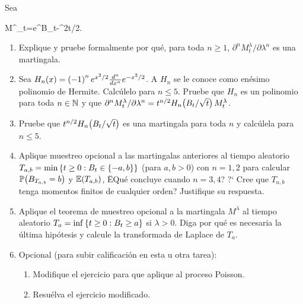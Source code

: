 \begin{problema}
	Sea
	\begin{esn}
		M^\lambda_t=e^{\lambda B_t-\lambda^2t/2}.
	\end{esn}
		\begin{enumerate}
			\item Explique y pruebe formalmente por qu\'e, para toda $n\geq 1$, $\partial^n M^\lambda_t/\partial \lambda^n$ es una martingala. 
			\item Sea $H_n\!\left( x\right) =\left( -1\right) ^ne^{x^2/2}\frac{d^n}{dx^n}e^{-x^2/2}$. A $H_n$ se le conoce como en\'esimo polinomio de Hermite. Calc\'ulelo para $n\leq 5$. Pruebe que $H_n$ es un polinomio para toda $n\in\mathbb{N}$ y que $\partial^n M^\lambda_t/\partial \lambda^n=t^{n/2}H_n\!\left( B_t/\sqrt{t}\right) M^\lambda_t$. 
			\item Pruebe que $t^{n/2}H_n\!\left( B_t/\sqrt{t}\right) $ es una martingala para toda $n$ y calc\'ulela para $n\leq 5$. 
			\item Aplique muestreo opcional a las martingalas anteriores al tiempo aleatorio $T_{a,b}=\min\left\{ t\geq 0:B_t\in\left\{ -a,b\right\} \right\} $ (para $a,b>0$) con $n=1,2$ para calcular $\mathbb{P}\! \left( B_{T_{a,b}}=b \right)$ y $\mathbb{E}\! \left( T_{a,b} \right)$, ËQu\'e concluye cuando $n=3,4$? ?` Cree que $T_{a,b}$ tenga momentos finitos de cualquier orden? Justifique su respuesta.
			\item Aplique el teorema de muestreo opcional a la martingala $M^\lambda $ al tiempo aleatorio $T_a=\inf\left\{ t\geq 0:B_t\geq a\right\} $ si $\lambda>0$. Diga por qu\'e es necesaria la \'ultima hip\'otesis y calcule la transformada de Laplace de $T_a$. 
			\item Opcional (para subir calificaci\'on en esta u otra tarea): 
			\begin{enumerate}
				\item Modifique el ejercicio para que aplique al proceso Poisson.
				\item Resu\'elva el ejercicio modificado. 
			\end{enumerate}
		\end{enumerate}
\end{problema}